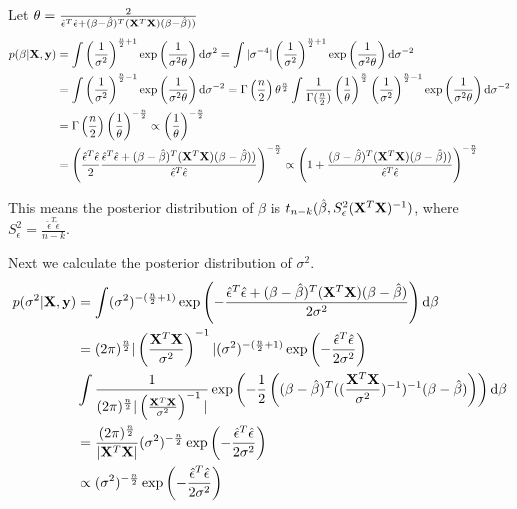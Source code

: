 \documentclass{article}
\begin{document}
	\subsection{}
	Let $\theta = \frac{2}{\hat{\epsilon}^T\hat{\epsilon} + (\beta - \hat{\beta})^T ({\bf X}^T{\bf X})(\beta - \hat{\beta}) )}$
		\begin{align*}
		p(\beta | {\bf X}, {\bf y}) &= \int \left( \frac{1}{\sigma^2}\right)^{\frac{n}{2} + 1} \exp \left( \frac{1}{\sigma^2 \theta}\right) \mathrm{d} \sigma^2
		= \int |\sigma^{-4}| \left(\frac{1}{\sigma^2} \right)^{\frac{n}{2} + 1} \exp \left( \frac{1}{\sigma^2 \theta}\right) \mathrm{d} \sigma^{-2}\\
		&= \int \left(\frac{1}{\sigma^2} \right)^{\frac{n}{2} -1} \exp \left( \frac{1}{\sigma^2 \theta}\right) \mathrm{d} \sigma^{-2}
		= \Gamma \left(\frac{n}{2} \right) \theta^{\frac{n}{2}} \int \frac{1}{\Gamma(\frac{n}{2})} \left(\frac{1}{\theta}\right)^{\frac{n}{2}} \left( \frac{1}{\sigma^2}\right)^{\frac{n}{2} -1} \exp \left( \frac{1}{\sigma^2 \theta}\right) \mathrm{d} \sigma^{-2}\\
		&= \Gamma \left(\frac{n}{2} \right) \left(\frac{1}{\theta} \right)^{-\frac{n}{2}}
		\propto \left(\frac{1}{\theta} \right)^{-\frac{n}{2}}\\
		&= \left( \frac{\hat{\epsilon}^T\hat{\epsilon}}{2} \frac{\hat{\epsilon}^T\hat{\epsilon} + (\beta - \hat{\beta})^T ({\bf X}^T{\bf X})(\beta - \hat{\beta}))}{\hat{\epsilon}^T\hat{\epsilon}}\right)^{-\frac{n}{2}}
		\propto \left( 1 + \frac{(\beta - \hat{\beta})^T ({\bf X}^T{\bf X})(\beta - \hat{\beta}))}{\hat{\epsilon}^T\hat{\epsilon}}\right)^{-\frac{n}{2}}\\
		\end{align*}
		\par 
		This means the posterior distribution of $\beta$ is $t_{n-k} (\hat{\beta} , S_{\epsilon}^2({\bf X}^T{\bf X})^{-1})$, where $S_{\epsilon}^2 = \frac{\hat{\epsilon}^T\hat{\epsilon}}{n-k}$.
		\par
		Next we calculate the posterior distribution of $\sigma^2$.
		\begin{align*}
			p(\sigma^2 | {\bf X}, {\bf y}) &= \int (\sigma^2)^{-(\frac{n}{2} + 1)} \exp\left( -\frac{\hat{\epsilon}^T\hat{\epsilon} + (\beta - \hat{\beta})^T ({\bf X}^T{\bf X})(\beta - \hat{\beta})}{2\sigma^2}\right) \mathrm{d} \beta\\
			&= (2\pi)^{\frac{n}{2}} |\left(\frac{{\bf X}^T{\bf X}}{\sigma^2}\right)^{-1}| (\sigma^2)^{-(\frac{n}{2} + 1)} \exp\left( -\frac{\hat{\epsilon}^T\hat{\epsilon}}{2\sigma^2}\right) \\ &\int \frac{1}{(2\pi)^{\frac{n}{2}} |\left(\frac{{\bf X}^T{\bf X}}{\sigma^2}\right)^{-1}|} \exp\left( -\frac{1}{2} \left( (\beta - \hat{\beta})^T ((\frac{{\bf X}^T {\bf X}}{\sigma^2})^{-1})^{-1} (\beta - \hat{\beta})\right)\right) \mathrm{d} \beta \\
			&= \frac{(2\pi)^{\frac{n}{2}}}{|{\bf X}^T{\bf X}|}(\sigma^2)^{-\frac{n}{2}} \exp\left( -\frac{\hat{\epsilon}^T\hat{\epsilon}}{2\sigma^2}\right)\\
			&\propto (\sigma^2)^{-\frac{n}{2}} \exp\left( -\frac{\hat{\epsilon}^T\hat{\epsilon}}{2\sigma^2}\right)\\
		\end{align*}
\end{document}
